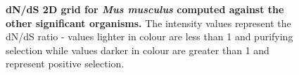 \documentclass{article}
\begin{document}
\begin{figure}[H]
\centering
{}
\caption{\textbf{dN/dS 2D grid for \textit{Mus musculus} computed against the other significant organisms.} The intensity values represent the dN/dS ratio - values lighter in colour are less than 1 and purifying selection while values darker in colour are greater than 1 and represent positive selection.}
\label{sup_fig_28}
\end{figure}
\end{document}
